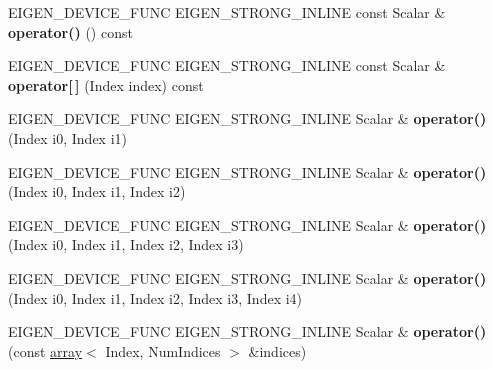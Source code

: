 \begin{DoxyCompactItemize}
\item 
\mbox{\label{class_eigen_1_1_tensor_fixed_size_a1cd33848d1ac865e5fcda56f8baeae2f}} 
E\+I\+G\+E\+N\+\_\+\+D\+E\+V\+I\+C\+E\+\_\+\+F\+U\+NC E\+I\+G\+E\+N\+\_\+\+S\+T\+R\+O\+N\+G\+\_\+\+I\+N\+L\+I\+NE const Scalar \& {\bfseries operator()} () const
\item 
\mbox{\label{class_eigen_1_1_tensor_fixed_size_a9a4d0421ac1c5e689dc96241ff2c7f1b}} 
E\+I\+G\+E\+N\+\_\+\+D\+E\+V\+I\+C\+E\+\_\+\+F\+U\+NC E\+I\+G\+E\+N\+\_\+\+S\+T\+R\+O\+N\+G\+\_\+\+I\+N\+L\+I\+NE const Scalar \& {\bfseries operator\mbox{[}$\,$\mbox{]}} (Index index) const
\item 
\mbox{\label{class_eigen_1_1_tensor_fixed_size_a1117e4cf49231ccbc373a51be7b12085}} 
E\+I\+G\+E\+N\+\_\+\+D\+E\+V\+I\+C\+E\+\_\+\+F\+U\+NC E\+I\+G\+E\+N\+\_\+\+S\+T\+R\+O\+N\+G\+\_\+\+I\+N\+L\+I\+NE Scalar \& {\bfseries operator()} (Index i0, Index i1)
\item 
\mbox{\label{class_eigen_1_1_tensor_fixed_size_a16d88f4f1fa3d5667e8c84b00f0d60e9}} 
E\+I\+G\+E\+N\+\_\+\+D\+E\+V\+I\+C\+E\+\_\+\+F\+U\+NC E\+I\+G\+E\+N\+\_\+\+S\+T\+R\+O\+N\+G\+\_\+\+I\+N\+L\+I\+NE Scalar \& {\bfseries operator()} (Index i0, Index i1, Index i2)
\item 
\mbox{\label{class_eigen_1_1_tensor_fixed_size_af44f61a0fbf62ac53f98bc829a6d6491}} 
E\+I\+G\+E\+N\+\_\+\+D\+E\+V\+I\+C\+E\+\_\+\+F\+U\+NC E\+I\+G\+E\+N\+\_\+\+S\+T\+R\+O\+N\+G\+\_\+\+I\+N\+L\+I\+NE Scalar \& {\bfseries operator()} (Index i0, Index i1, Index i2, Index i3)
\item 
\mbox{\label{class_eigen_1_1_tensor_fixed_size_af6510afbaa532c90e154b54ca5190e58}} 
E\+I\+G\+E\+N\+\_\+\+D\+E\+V\+I\+C\+E\+\_\+\+F\+U\+NC E\+I\+G\+E\+N\+\_\+\+S\+T\+R\+O\+N\+G\+\_\+\+I\+N\+L\+I\+NE Scalar \& {\bfseries operator()} (Index i0, Index i1, Index i2, Index i3, Index i4)
\item 
\mbox{\label{class_eigen_1_1_tensor_fixed_size_a656cb9e7ff25fb122c8e287431b7df95}} 
E\+I\+G\+E\+N\+\_\+\+D\+E\+V\+I\+C\+E\+\_\+\+F\+U\+NC E\+I\+G\+E\+N\+\_\+\+S\+T\+R\+O\+N\+G\+\_\+\+I\+N\+L\+I\+NE Scalar \& {\bfseries operator()} (const \hyperlink{class_eigen_1_1array}{array}$<$ Index, Num\+Indices $>$ \&indices)

\end{DoxyCompactItemize}
